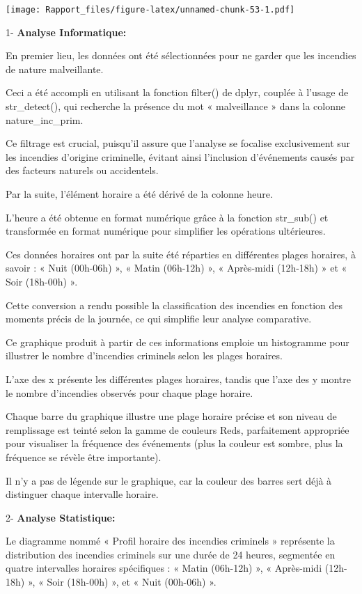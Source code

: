 \documentclass[
]{article}
\begin{document}
\texttt{[image: Rapport\_files/figure-latex/unnamed-chunk-53-1.pdf]}

1- \textbf{Analyse Informatique:}

En premier lieu, les données ont été sélectionnées pour ne garder que
les incendies de nature malveillante.

Ceci a été accompli en utilisant la fonction filter() de dplyr, couplée
à l'usage de str\_detect(), qui recherche la présence du mot «
malveillance » dans la colonne nature\_inc\_prim.

Ce filtrage est crucial, puisqu'il assure que l'analyse se focalise
exclusivement sur les incendies d'origine criminelle, évitant ainsi
l'inclusion d'événements causés par des facteurs naturels ou
accidentels.

Par la suite, l'élément horaire a été dérivé de la colonne heure.

L'heure a été obtenue en format numérique grâce à la fonction str\_sub()
et transformée en format numérique pour simplifier les opérations
ultérieures.

Ces données horaires ont par la suite été réparties en différentes
plages horaires, à savoir : « Nuit (00h-06h) », « Matin (06h-12h) », «
Après-midi (12h-18h) » et « Soir (18h-00h) ».

Cette conversion a rendu possible la classification des incendies en
fonction des moments précis de la journée, ce qui simplifie leur analyse
comparative.

Ce graphique produit à partir de ces informations emploie un histogramme
pour illustrer le nombre d'incendies criminels selon les plages
horaires.

L'axe des x présente les différentes plages horaires, tandis que l'axe
des y montre le nombre d'incendies observés pour chaque plage horaire.

Chaque barre du graphique illustre une plage horaire précise et son
niveau de remplissage est teinté selon la gamme de couleurs Reds,
parfaitement appropriée pour visualiser la fréquence des événements
(plus la couleur est sombre, plus la fréquence se révèle être
importante).

Il n'y a pas de légende sur le graphique, car la couleur des barres sert
déjà à distinguer chaque intervalle horaire.

2- \textbf{Analyse Statistique:}

Le diagramme nommé « Profil horaire des incendies criminels » représente
la distribution des incendies criminels sur une durée de 24 heures,
segmentée en quatre intervalles horaires spécifiques : « Matin (06h-12h)
», « Après-midi (12h-18h) », « Soir (18h-00h) », et « Nuit (00h-06h) ».
\end{document}
